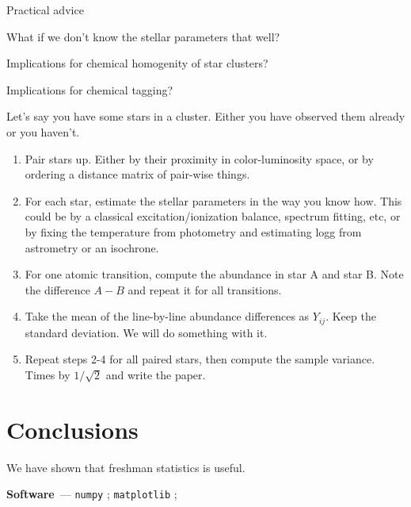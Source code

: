 \documentclass[modern]{aastex631}
\renewcommand{\paragraph}[1]{\medskip\par\noindent\textbf{#1}~---}
\newcommand{\todo}[1]{\textcolor{tab:red}{#1}}
\begin{document}
\todo{Practical advice}

\todo{What if we don't know the stellar parameters that well?}

\todo{Implications for chemical homogenity of star clusters?}

\todo{Implications for chemical tagging?}

Let's say you have some stars in a cluster. Either you have observed them already or you haven't.
\begin{enumerate}
    \item Pair stars up. Either by their proximity in color-luminosity space, or by ordering a distance matrix of pair-wise things.
    \item For each star, estimate the stellar parameters in the way you know how. This could be by a classical excitation/ionization balance, spectrum fitting, etc, or by fixing the temperature from photometry and estimating logg from astrometry or an isochrone.
    \item For one atomic transition, compute the abundance in star A and star B. Note the difference $A-B$ and repeat it for all transitions.
    \item Take the mean of the line-by-line abundance differences as $Y_{ij}$. Keep the standard deviation. We will do something with it.
    \item Repeat steps 2-4 for all paired stars, then compute the sample variance. Times by $1/\sqrt{2}$ and write the paper.
\end{enumerate}



\section{Conclusions} \label{sec:conclusions}
We have shown that freshman statistics is useful.

\paragraph{Software}
\texttt{numpy} \citep{numpy}; 
\texttt{matplotlib} \citep{matplotlib}; 



%
\end{document}
